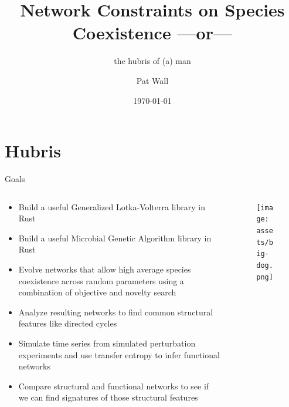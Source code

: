 \documentclass{cubeamer}
\title{Network Constraints on Species Coexistence ---or---}
\subtitle{the hubris of (a) man}
\author[Pat Wall]{Pat Wall}
\date{\today} %
\institute[Indiana University]
\begin{document}
\maketitle

\cutoc

\section{Hubris}

\begin{frame}{Goals}
    \begin{columns}
        \begin{column}{0.7\textwidth}
            \begin{itemize}
                \item Build a useful Generalized Lotka-Volterra library in Rust
                \item Build a useful Microbial Genetic Algorithm library in Rust
                \item Evolve networks that allow high average species coexistence across random parameters using a combination of objective and novelty search
                \item Analyze resulting networks to find common structural features like directed cycles
                \item Simulate time series from simulated perturbation experiments and use transfer entropy to infer functional networks
                \item Compare structural and functional networks to see if we can find signatures of those structural features
            \end{itemize}
        \end{column}
        \begin{column}{0.3\textwidth}
            \begin{figure}
                \texttt{[image: assets/big-dog.png]}
            \end{figure}
        \end{column}
    \end{columns}
\end{frame}
\end{document}

